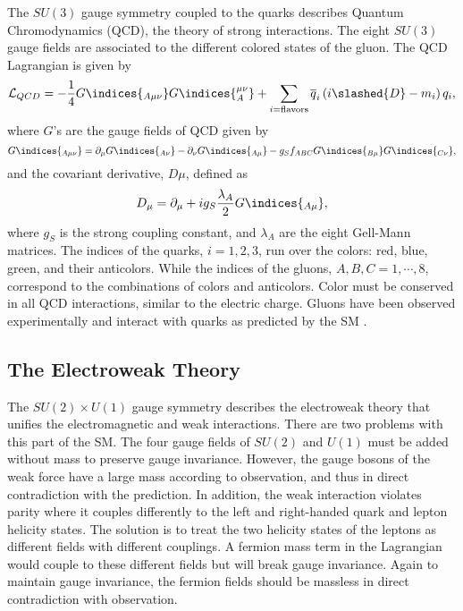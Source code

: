 The $ SU\left(3\right) $ gauge symmetry coupled to the quarks describes Quantum Chromodynamics (QCD), the theory of strong interactions.
The eight $ SU\left(3\right) $ gauge fields are associated to the different colored states of the gluon.
The QCD Lagrangian is given by
\begin{equation}
\mathcal{L}_{QCD} = -\frac{1}{4} G\indices{_{A\mu\nu}}G\indices{_{A}^{\mu\nu}} + \sum_{i=\text{flavors}} \overline{q}_i \left(i\slashed{D} - m_i\right) q_i,
\end{equation}
where $G$'s are the gauge fields of QCD given by 
\begin{equation}
G\indices{_{A\mu\nu}} = \partial_{\mu} G\indices{_{A\nu}} - \partial_{\nu} G\indices{_{A\mu}} - g_S f_{ABC} G\indices{_{B\mu}} G\indices{_{C\nu}},
\end{equation}
and the covariant derivative, $D\mu$,  defined as
\begin{equation}
D_\mu = \partial_{\mu} + i g_S \frac{\lambda_A}{2}G\indices{_{A\mu}},
\end{equation}
where $g_S$ is the strong coupling constant, and $\lambda_A$ are the eight Gell-Mann matrices.
The indices of the quarks, $i=1,2,3$, run over the colors: red, blue, green, and their anticolors.
While the indices of the gluons, $A,B,C = 1, \cdots, 8$, correspond to the combinations of colors and anticolors.
Color must be conserved in all QCD interactions, similar to the  electric charge.
Gluons have been observed experimentally  and interact with quarks as predicted by the SM \cite{BRANDELIK1979243}.

\subsection{The Electroweak Theory}

The $ SU\left(2\right) \times U\left(1\right) $ gauge symmetry describes the
electroweak theory that unifies the electromagnetic and weak interactions.
There are two problems with this part of the SM.
The four gauge fields of $ SU\left(2\right) $ and $ U\left(1\right) $ 
must be added without mass to preserve gauge invariance.
However, the gauge bosons of the weak force have a large mass according to observation,
and thus in direct contradiction with the prediction.
In addition, the weak interaction violates parity where it couples differently 
to the left and right-handed quark and lepton helicity states.
The solution is to treat the two helicity states of the leptons as different fields
with different couplings. A fermion mass term in the Lagrangian would couple to 
these different fields but will break gauge invariance.
Again to maintain gauge invariance, the fermion fields should be massless in 
direct contradiction with observation.


